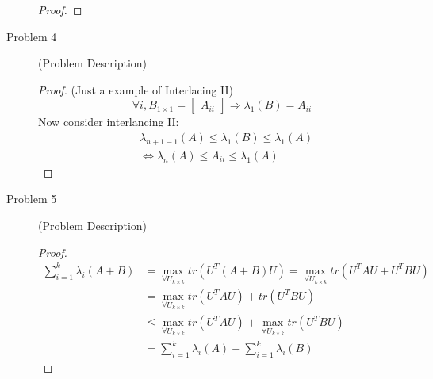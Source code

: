 \documentclass{article}
\begin{document}
\begin{description}
\begin{proof}
	\end{proof}
	\item[Problem 4] (Problem Description)
	\begin{proof}
		(Just a example of Interlacing II)
		$$\forall i, B_{1 \times 1} = \begin{bmatrix}A_{ii}\end{bmatrix} \Rightarrow \lambda_1(B) = A_{ii}$$
		Now consider interlancing II:
		\begin{equation}\begin{aligned}
			& \lambda_{n+1-1}(A) \leq \lambda_1(B) \leq \lambda_{1}(A) \\
			& \Leftrightarrow \lambda_n(A) \leq A_{ii} \leq \lambda_{1}(A)
		\end{aligned}\end{equation}
		\end{proof}
	\item[Problem 5] (Problem Description)
	\begin{proof}
		\begin{equation}\begin{aligned}
			    \sum_{i = 1}^k\lambda_i(A+B) 
			& =	\max_{\forall U_{k \times k}} tr(U^T(A+B)U) = \max_{\forall U_{k \times k}} tr(U^TAU+U^TBU) \\ 
			& = \max_{\forall U_{k \times k}} tr(U^TAU)+tr(U^TBU) \\
			& \leq \max_{\forall U_{k \times k}} tr(U^TAU)+\max_{\forall U_{k \times k}} tr(U^TBU) \\
			& = \sum_{i = 1}^k\lambda_i(A) + \sum_{i = 1}^k\lambda_i(B) 
		\end{aligned}\end{equation}
	\end{proof}

\end{description}
\end{document}
